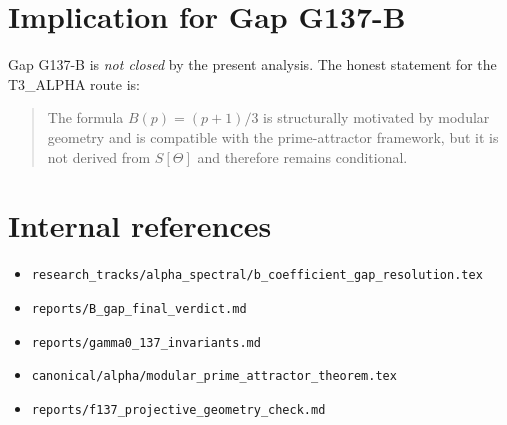 \documentclass[12pt,a4paper]{article}
\theoremstyle{remark}
\begin{document}
\section{Implication for Gap G137-B}

Gap G137-B is \emph{not closed} by the present analysis.  The honest statement
for the T3\_ALPHA route is:
\begin{quote}
The formula $B(p)=(p+1)/3$ is structurally motivated by modular geometry and is
compatible with the prime-attractor framework, but it is not derived from
$S[\Theta]$ and therefore remains conditional.
\end{quote}

\section*{Internal references}

\begin{itemize}
  \item \texttt{research\_tracks/alpha\_spectral/b\_coefficient\_gap\_resolution.tex}
  \item \texttt{reports/B\_gap\_final\_verdict.md}
  \item \texttt{reports/gamma0\_137\_invariants.md}
  \item \texttt{canonical/alpha/modular\_prime\_attractor\_theorem.tex}
  \item \texttt{reports/f137\_projective\_geometry\_check.md}
\end{itemize}
\end{document}
